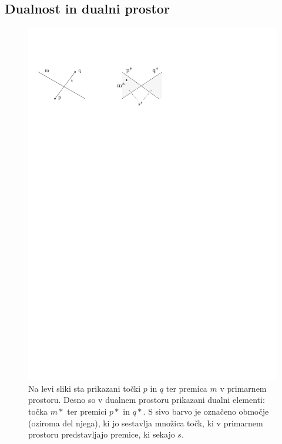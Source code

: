 \documentclass[a4paper, 12pt]{book}
\begin{document}
\subsection{Dualnost in dualni prostor}
\begin{figure}
\centerline{\includegraphics[scale=1]{pics/dual-lines-example.pdf}}
\caption{Na levi sliki sta prikazani točki $p$ in $q$ ter premica $m$ v primarnem prostoru. Desno so v dualnem prostoru prikazani dualni elementi: točka $m*$ ter premici $p*$ in $q*$. S sivo barvo je označeno območje (oziroma del njega), ki jo sestavlja množica točk, ki v primarnem prostoru predstavljajo premice, ki sekajo $s$.} 
\label{dual-ex}
\end{figure}
\end{document}
